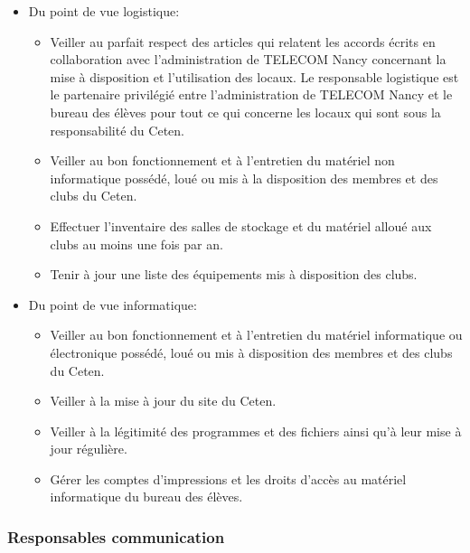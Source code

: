 \documentclass{article} %
\begin{document}
				\begin{itemize}
				
					\item Du point de vue logistique:
					
					\begin{itemize}
						\item Veiller au parfait respect des articles qui relatent
							les accords écrits en collaboration avec l'administration
							de TELECOM Nancy concernant la mise à disposition et 
							l'utilisation des locaux. Le responsable logistique est 
							le partenaire privilégié entre l'administration de 
							TELECOM Nancy et le bureau des élèves pour tout ce qui
							concerne les locaux qui sont sous la responsabilité du
							Ceten.
						\item Veiller au bon fonctionnement et à l’entretien du
							matériel non informatique possédé, loué ou mis à la
							disposition des membres et des clubs du Ceten.
						\item Effectuer l’inventaire des salles de stockage et du
							matériel alloué aux clubs au moins une fois par an.
						\item Tenir à jour une liste des équipements mis à 
							disposition des clubs.
					\end{itemize}
					
					\item Du point de vue informatique:
					
					\begin{itemize}
						\item Veiller au bon fonctionnement et à l’entretien du
							matériel informatique ou électronique possédé, loué ou
							mis à disposition des membres et des clubs du Ceten.
						\item Veiller à la mise à jour du site du Ceten.
						\item Veiller à la légitimité des programmes et des fichiers
							ainsi qu’à leur mise à jour régulière.
						\item Gérer les comptes d’impressions et les droits d’accès 
							au matériel informatique du bureau des élèves.
					\end{itemize}
					
				\end{itemize}

			\subsubsection{Responsables communication}
\label{ssub:responsables_communication}
\end{document}
